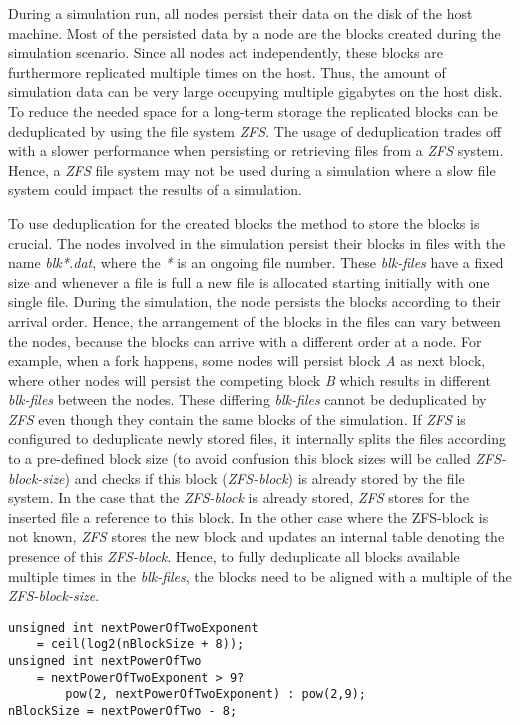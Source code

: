 During a simulation run, all nodes persist their data on the disk of the host machine.
Most of the persisted data by a node are the blocks created during the simulation scenario.
Since all nodes act independently, these blocks are furthermore replicated multiple times on the host.
Thus, the amount of simulation data can be very large occupying multiple gigabytes on the host disk.
To reduce the needed space for a long-term storage the replicated blocks can be deduplicated by using the file system \textit{ZFS}.
The usage of deduplication trades off with a slower performance when persisting or retrieving files from a \textit{ZFS} system.
Hence, a \textit{ZFS} file system may not be used during a simulation where a slow file system could impact the results of a simulation.

To use deduplication for the created blocks the method to store the blocks is crucial.
The nodes involved in the simulation persist their blocks in files with the name \textit{blk*.dat}, where the \textit{*} is an ongoing file number.
These \textit{blk-files} have a fixed size and whenever a file is full a new file is allocated starting initially with one single file.
During the simulation, the node persists the blocks according to their arrival order.
Hence, the arrangement of the blocks in the files can vary between the nodes, because the blocks can arrive with a different order at a node.
For example, when a fork happens, some nodes will persist block \textit{A} as next block, where other nodes will persist the competing block \textit{B} which results in different \textit{blk-files} between the nodes.
These differing \textit{blk-files} cannot be deduplicated by \textit{ZFS} even though they contain the same blocks of the simulation.
If \textit{ZFS} is configured to deduplicate newly stored files, it internally splits the files according to a pre-defined block size (to avoid confusion this block sizes will be called \textit{ZFS-block-size}) and checks if this block (\textit{ZFS-block}) is already stored by the file system.
In the case that the \textit{ZFS-block} is already stored, \textit{ZFS} stores for the inserted file a reference to this block.
In the other case where the ZFS-block is not known, \textit{ZFS} stores the new block and updates an internal table denoting the presence of this \textit{ZFS-block}.
Hence, to fully deduplicate all blocks available multiple times in the \textit{blk-files}, the blocks need to be aligned with a multiple of the \textit{ZFS-block-size}.

\begin{minipage}{\linewidth}
\begin{lstlisting}[caption=Aligning the block size in the Bitcoin reference implementation for \textit{ZFS}, label={lst:align_zfs}, basicstyle=\ttfamily, captionpos=b]
unsigned int nextPowerOfTwoExponent
	= ceil(log2(nBlockSize + 8));
unsigned int nextPowerOfTwo
	= nextPowerOfTwoExponent > 9?
		pow(2, nextPowerOfTwoExponent) : pow(2,9);
nBlockSize = nextPowerOfTwo - 8;
\end{lstlisting}
\end{minipage}

